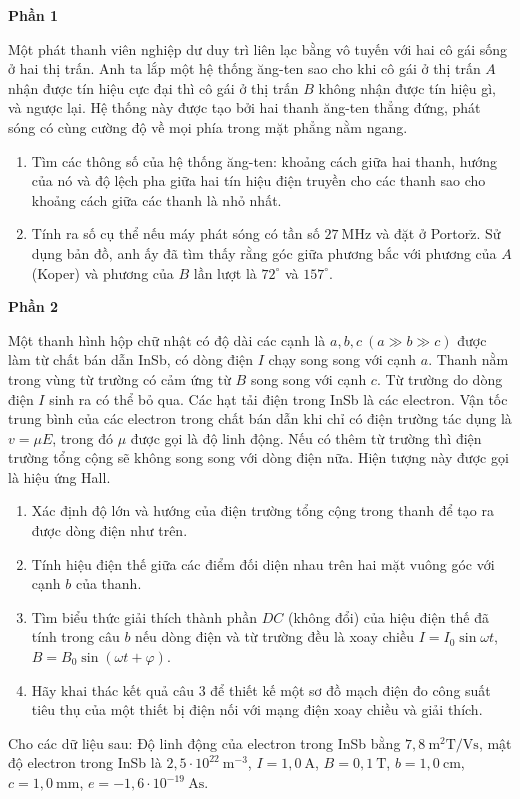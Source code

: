 \begin{vd}
\begin{center}
    \bf Phần 1
\end{center}
Một phát thanh viên nghiệp dư duy trì liên lạc bằng vô tuyến với hai cô gái sống ở hai thị trấn. Anh ta lắp một hệ thống ăng-ten sao cho khi cô gái ở thị trấn $A$ nhận được tín hiệu cực đại thì cô gái ở thị trấn $B$ không nhận được tín hiệu gì, và ngược lại. Hệ thống này được tạo bởi hai thanh ăng-ten thẳng đứng, phát sóng có cùng cường độ về mọi phía trong mặt phẳng nằm ngang.  
\begin{enumerate}[1)]
    \item Tìm các thông số của hệ thống ăng-ten: khoảng cách giữa hai thanh, hướng của nó và độ lệch pha giữa hai tín hiệu điện truyền cho các thanh sao cho khoảng cách giữa các thanh là nhỏ nhất.
    \item Tính ra số cụ thể nếu máy phát sóng có tần số $27~ \mathrm{MHz} $ và đặt ở Portor$\check{\text{z}}$. Sử dụng bản đồ, anh ấy đã tìm thấy rằng góc giữa phương bắc với phương của $A$ (Koper) và phương của $B$ lần lượt là $72^\circ$ và $157^\circ$. 
\end{enumerate}
\begin{center}
    \bf Phần 2
\end{center}
Một thanh hình hộp chữ nhật có độ dài các cạnh là $a, b, c~ (a \gg b \gg c)$ được làm từ chất bán dẫn InSb, có dòng điện $I$ chạy song song với cạnh $a$. Thanh nằm trong vùng từ trường có cảm ứng từ $B$  song song với cạnh $c$. Từ trường do dòng điện $I$ sinh ra có thể bỏ qua. Các hạt tải điện trong InSb là các electron. Vận tốc trung bình của các electron trong chất bán dẫn khi chỉ có điện trường tác dụng là $v = \mu E$, trong đó $\mu$ được gọi là độ linh động. Nếu có thêm từ trường thì điện trường tổng cộng sẽ không song song với dòng điện nữa. Hiện tượng này được gọi là hiệu ứng Hall.
\begin{enumerate}[1)]
    \item Xác định độ lớn và hướng của điện trường tổng cộng trong thanh để tạo ra được dòng điện như trên.
    \item Tính hiệu điện thế giữa các điểm đối diện nhau trên hai mặt vuông góc với cạnh $b$ của thanh.
    \item Tìm biểu thức giải thích thành phần $DC$ (không đổi) của hiệu điện thế đã tính trong câu $b$ nếu dòng điện và từ trường đều là xoay chiều $I = I_0 \sin \omega t$, $B = B_0 \sin \left(\omega t + \varphi \right)$.
    \item  Hãy khai thác kết quả câu $3$ để thiết kế một sơ đồ mạch điện đo công suất tiêu thụ của một thiết bị điện nối với mạng điện xoay chiều và giải thích.
\end{enumerate}
Cho các dữ liệu sau: Độ linh động của electron trong InSb bằng $7,8~\mathrm{m^2T/Vs}$, mật độ electron trong InSb là $2,5 \cdot 10^{22} ~\mathrm{m}^{-3}$, $I = 1,0 ~\mathrm{A}$, $B = 0,1~\mathrm{T}$, $b = 1,0 ~\mathrm{cm}$, $c = 1,0 ~\mathrm{mm}$, $e = -1,6 \cdot 10^{-19}~\mathrm{As}$.  
\end{vd}

